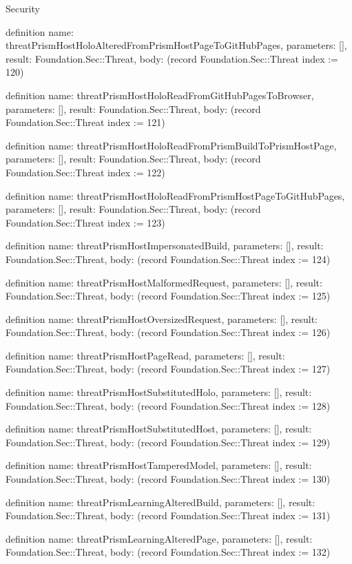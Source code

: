 \begin{lexlean}{Security}
\begin{semanticmodule}
definition{
  name: threatPrismHostHoloAlteredFromPrismHostPageToGitHubPages,
  parameters: [],
  result: Foundation.Sec::Threat,
  body: (record Foundation.Sec::Threat {index := 120})
}

definition{
  name: threatPrismHostHoloReadFromGitHubPagesToBrowser,
  parameters: [],
  result: Foundation.Sec::Threat,
  body: (record Foundation.Sec::Threat {index := 121})
}

definition{
  name: threatPrismHostHoloReadFromPrismBuildToPrismHostPage,
  parameters: [],
  result: Foundation.Sec::Threat,
  body: (record Foundation.Sec::Threat {index := 122})
}

definition{
  name: threatPrismHostHoloReadFromPrismHostPageToGitHubPages,
  parameters: [],
  result: Foundation.Sec::Threat,
  body: (record Foundation.Sec::Threat {index := 123})
}

definition{
  name: threatPrismHostImpersonatedBuild,
  parameters: [],
  result: Foundation.Sec::Threat,
  body: (record Foundation.Sec::Threat {index := 124})
}

definition{
  name: threatPrismHostMalformedRequest,
  parameters: [],
  result: Foundation.Sec::Threat,
  body: (record Foundation.Sec::Threat {index := 125})
}

definition{
  name: threatPrismHostOversizedRequest,
  parameters: [],
  result: Foundation.Sec::Threat,
  body: (record Foundation.Sec::Threat {index := 126})
}

definition{
  name: threatPrismHostPageRead,
  parameters: [],
  result: Foundation.Sec::Threat,
  body: (record Foundation.Sec::Threat {index := 127})
}

definition{
  name: threatPrismHostSubstitutedHolo,
  parameters: [],
  result: Foundation.Sec::Threat,
  body: (record Foundation.Sec::Threat {index := 128})
}

definition{
  name: threatPrismHostSubstitutedHost,
  parameters: [],
  result: Foundation.Sec::Threat,
  body: (record Foundation.Sec::Threat {index := 129})
}

definition{
  name: threatPrismHostTamperedModel,
  parameters: [],
  result: Foundation.Sec::Threat,
  body: (record Foundation.Sec::Threat {index := 130})
}

definition{
  name: threatPrismLearningAlteredBuild,
  parameters: [],
  result: Foundation.Sec::Threat,
  body: (record Foundation.Sec::Threat {index := 131})
}

definition{
  name: threatPrismLearningAlteredPage,
  parameters: [],
  result: Foundation.Sec::Threat,
  body: (record Foundation.Sec::Threat {index := 132})
}


\end{semanticmodule}
\end{lexlean}
